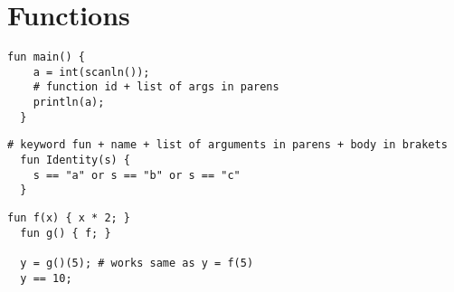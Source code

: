 \chapter{Functions}

\begin{example}
\begin{lstlisting}[language=intentio]
  fun main() {
    a = int(scanln());
    # function id + list of args in parens
    println(a);
  }
\end{lstlisting}
\end{example}

\begin{example}
\begin{lstlisting}[language=intentio]
  # keyword fun + name + list of arguments in parens + body in brakets
  fun Identity(s) {
    s == "a" or s == "b" or s == "c"
  }
\end{lstlisting}
\end{example}

\begin{example}
\begin{lstlisting}[language=intentio,mathescape=true]
  fun f(x) { x * 2; }
  fun g() { f; }

  y = g()(5); # works same as y = f(5)
  y == 10;
\end{lstlisting}
\end{example}
